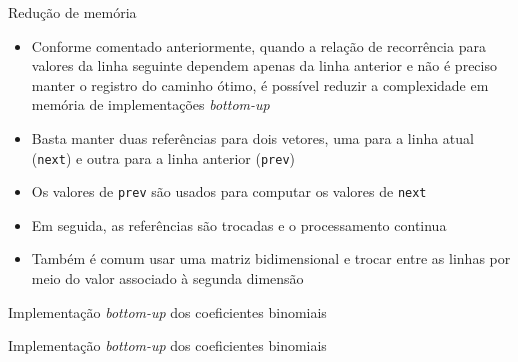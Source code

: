\begin{frame}[fragile]{Redução de memória}

    \begin{itemize}
        \item Conforme comentado anteriormente, quando a relação de recorrência para valores da
            linha seguinte dependem apenas da linha anterior e não é preciso manter o registro
            do caminho ótimo, é possível reduzir a complexidade em memória de implementações
           \textit{bottom-up}
        \pause

        \item Basta manter duas referências para dois vetores, uma para a linha atual
            (\texttt{next}) e outra para a linha anterior (\texttt{prev})
        \pause

        \item Os valores de \texttt{prev} são usados para computar os valores de \texttt{next}
        \pause

        \item Em seguida, as referências são trocadas e o processamento continua
        \pause

        \item Também é comum usar uma matriz bidimensional e trocar entre as linhas por meio
            do valor associado à segunda dimensão
    \end{itemize}

\end{frame}

\begin{frame}[fragile]{Implementação {\it bottom-up} dos coeficientes binomiais}
\end{frame}

\begin{frame}[fragile]{Implementação {\it bottom-up} dos coeficientes binomiais}
\end{frame}
